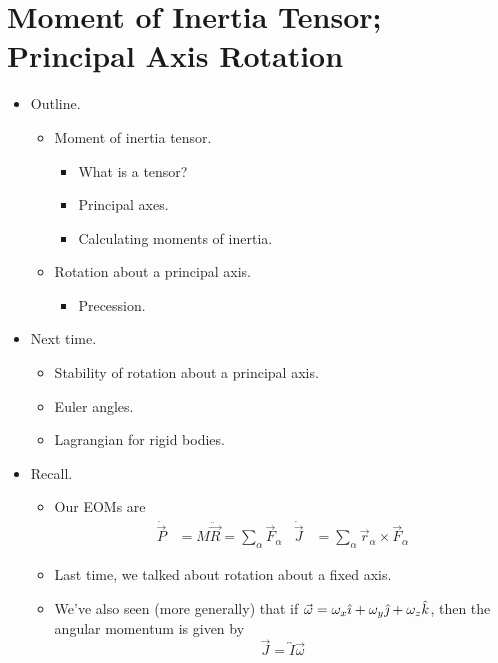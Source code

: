 \documentclass[../notes.tex]{subfiles}
\begin{document}
\section{Moment of Inertia Tensor; Principal Axis Rotation}
\begin{itemize}
    \item {}Outline.
    \begin{itemize}
        \item Moment of inertia tensor.
        \begin{itemize}
            \item What is a tensor?
            \item Principal axes.
            \item Calculating moments of inertia.
        \end{itemize}
        \item Rotation about a principal axis.
        \begin{itemize}
            \item Precession.
        \end{itemize}
    \end{itemize}
    \item Next time.
    \begin{itemize}
        \item Stability of rotation about a principal axis.
        \item Euler angles.
        \item Lagrangian for rigid bodies.
    \end{itemize}
    \item Recall.
    \begin{itemize}
        \item Our EOMs are
        \begin{align*}
            \dot{\vec{P}} &= M\ddot{\vec{R}} = \sum_\alpha\vec{F}_\alpha&
            \dot{\vec{J}} &= \sum_\alpha\vec{r}_\alpha\times\vec{F}_\alpha
        \end{align*}
        \item Last time, we talked about rotation about a fixed axis.
        \item We've also seen (more generally) that if $\vec{\omega}=\omega_x\hat{\imath}+\omega_y\hat{\jmath}+\omega_z\hat{k}$, then the angular momentum is given by
        \begin{equation*}
            \vec{J} = \overleftrightarrow{I}\vec{\omega}
        \end{equation*}
    \end{itemize}

\end{itemize}
\end{document}

